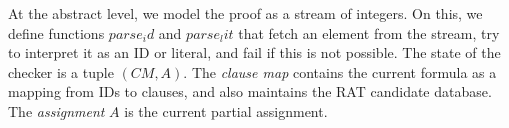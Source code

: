 \documentclass[smallcondensed]{svjour3}     %
\makeatletter
\newcommand{\isai}{\lstinline[language=isabelle,basicstyle=\normalsize\ttfamily\slshape]}
\renewcommand\lstinline[1][]{%
  \leavevmode
  \ifmmode\expandafter\hbox\fi\bgroup
    \def\lst@boxpos{b}%
    \lsthk@PreSet\lstset{flexiblecolumns,#1}%
    \lsthk@TextStyle
    \@ifnextchar\bgroup{\afterassignment\lst@InlineG \let\@let@token}%
                       \lstinline@}
\makeatother
\begin{document}
At the abstract level, we model the proof as a stream of integers. On this, we define functions \isai$parse_id$ and \isai$parse_lit$ that fetch an 
element from the stream, try to interpret it as an ID or literal, and fail if this is not possible.
The state of the checker is a tuple \isai$(CM,A)$. The \emph{clause map} \isai{CM} contains the current formula as a mapping from IDs to clauses, 
and also maintains the RAT candidate database. The \emph{assignment} \isai$A$ is the current partial assignment.

% 
% 
\end{document}
